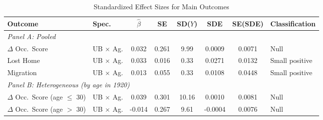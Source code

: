\begin{table}[H]
\centering
\caption{Standardized Effect Sizes for Main Outcomes}
\label{tab:sde}
\begin{threeparttable}
\footnotesize
\begin{adjustbox}{max width=\textwidth}
\begin{tabular}{llcccccl}
\toprule
Outcome & Spec. & $\hat{\beta}$ & SE & SD($Y$) & SDE & SE(SDE) & Classification \\
\midrule
\multicolumn{8}{l}{\textit{Panel A: Pooled}} \\
$\Delta$ Occ.\ Score & UB $\times$ Ag. & 0.032 & 0.261 & 9.99 & 0.0009 & 0.0071 & Null \\
Lost Home & UB $\times$ Ag. & 0.033 & 0.016 & 0.33 & 0.0271 & 0.0132 & Small positive \\
Migration & UB $\times$ Ag. & 0.013 & 0.055 & 0.33 & 0.0108 & 0.0448 & Small positive \\
\midrule
\multicolumn{8}{l}{\textit{Panel B: Heterogeneous (by age in 1920)}} \\
$\Delta$ Occ.\ Score (age $\leq$ 30) & UB $\times$ Ag. & 0.039 & 0.301 & 10.16 & 0.0010 & 0.0081 & Null \\
$\Delta$ Occ.\ Score (age $>$ 30) & UB $\times$ Ag. & -0.014 & 0.267 & 9.61 & -0.0004 & 0.0076 & Null \\
\bottomrule
\end{tabular}
\end{adjustbox}
\begin{tablenotes}[flushleft]
\scriptsize

\end{tablenotes}
\end{threeparttable}
\end{table}
